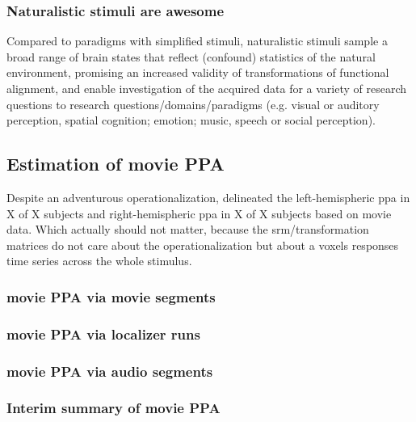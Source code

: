 \subsubsection{Naturalistic stimuli are awesome}

Compared to paradigms with simplified stimuli, naturalistic stimuli sample a
broad range of brain states \citep{guntupalli2016model, haxby2011common} that
reflect (confound) statistics of the natural environment, promising an increased
validity of transformations of functional alignment, and enable investigation of
the acquired data for a variety of research questions to research
questions/domains/paradigms (e.g.  visual or auditory perception, spatial
cognition; emotion; music, speech or social perception).



\subsection{Estimation of movie PPA}



Despite an adventurous operationalization, \citet{haeusler2022processing}
delineated the left-hemispheric \ac{ppa} in X of X subjects and
right-hemispheric \ac{ppa} in X of X subjects based on movie data.
%
Which actually should not matter, because the \ac{srm}/transformation matrices
do not care about the operationalization but about a voxels responses time
series across the whole stimulus.

\subsubsection{movie PPA via movie segments}

\subsubsection{movie PPA via localizer runs}

\subsubsection{movie PPA via audio segments}

\subsubsection{Interim summary of movie PPA}



